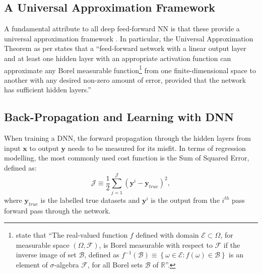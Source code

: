 \subsection{A Universal Approximation Framework}\label{sec:theory_UAT}
A fundamental attribute to all deep feed-forward NN is that these provide a universal approximation framework \citep{Hornik1989}. In particular, the Universal Approximation Theorem as per \citet{Leshno1993} states that a ``feed-forward network with a linear output layer and at least one hidden layer with an appropriate activation function can approximate any Borel measurable function\footnote{\citet{Stephens2006} state that ``The real-valued function $f$ defined with domain $\mathcal{E}\subset\Omega$, for measurable space $(\Omega,\mathcal{F})$, is Borel measurable with respect to $\mathcal{F}$ if the inverse image of set $\mathcal{B}$, defined as $f^{-1} (\mathcal{B})\equiv\left\{\omega\in\mathcal{E}:f(\omega)\in\mathcal{B}\right\}$ is an element of $\sigma$-algebra $\mathcal{F}$, for all Borel sets $\mathcal{B}$ of $\mathbb{R}$''.} from one finite-dimensional space to another with any desired non-zero amount of error, provided that the network has sufficient hidden layers.''
\clearpage

\subsection{Back-Propagation and Learning with DNN}
When training a DNN, the forward propagation through the hidden layers from input $\boldsymbol{x}$ to output $\boldsymbol{y}$ needs to be measured for its misfit. In terms of regression modelling, the most commonly used cost function is the Sum of Squared Error, defined as:
\begin{equation}\label{eq:dnn_cost_function_J}
	\mathcal{J}\equiv\frac{1}{2}\sum_{j=1}^{\mathcal{J}}\left(\boldsymbol{y}^i-\boldsymbol{y}_{true}\right)^2,
\end{equation}
where $\boldsymbol{y}_{true}$ is the labelled true datasets and $\boldsymbol{y}^{i}$ is the output from the $i^{th}$ pass forward pass through the network. 

